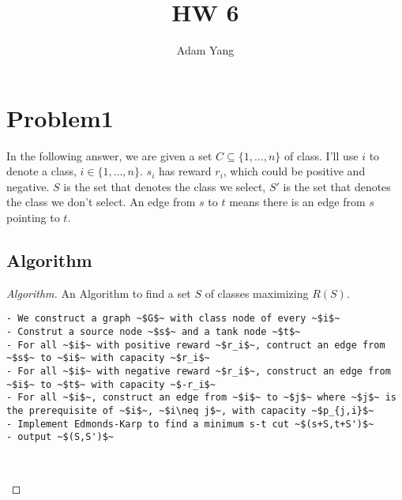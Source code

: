 \documentclass[openany]{article}
\begin{document}
\title{HW 6}
\author{Adam Yang}
\maketitle




\section*{Problem1}
In the following answer, we are given a set $C \subseteq \{1,...,n\}$ of class. I'll use $i$ to denote a class, $i \in \{1,...,n\}$. $s_i$ has reward $r_i$, which could be positive and negative. $S$ is the set that denotes the class we select, $S'$ is the set that denotes the class we don't select. An edge from $s$ to $t$ means there is an edge from $s$ pointing to $t$.

\subsection*{Algorithm}
\begin{proof}[Algorithm]{}
		\renewcommand{\qedsymbol}{}
		An Algorithm to find a set $S$ of classes maximizing $R(S)$.
		\begin{lstlisting}[basicstyle=\fontsize{8}{9}\selectfont\ttfamily]
- We construct a graph ~$G$~ with class node of every ~$i$~
- Construt a source node ~$s$~ and a tank node ~$t$~
- For all ~$i$~ with positive reward ~$r_i$~, contruct an edge from ~$s$~ to ~$i$~ with capacity ~$r_i$~
- For all ~$i$~ with negative reward ~$r_i$~, construct an edge from ~$i$~ to ~$t$~ with capacity ~$-r_i$~
- For all ~$i$~, construct an edge from ~$i$~ to ~$j$~ where ~$j$~ is the prerequisite of ~$i$~, ~$i\neq j$~, with capacity ~$p_{j,i}$~
- Implement Edmonds-Karp to find a minimum s-t cut ~$(s+S,t+S')$~
- output ~$(S,S')$~

        
		\end{lstlisting} 
\end{proof}
\end{document}
